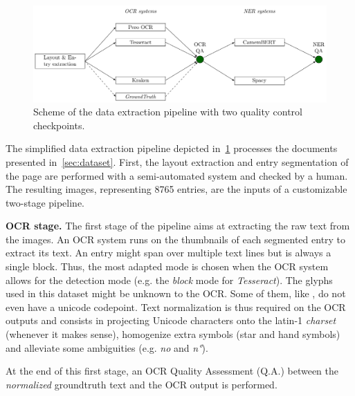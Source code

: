 \begin{figure}[tb]
    \includegraphics[width=\linewidth]{figs/protocol.pdf}
    \caption{Scheme of the data extraction pipeline with two quality control checkpoints. }
    \label{fig.pipeline}
\end{figure}



The simplified data extraction pipeline depicted in~\cref{fig.pipeline} processes the documents presented
in~\cref{sec:dataset}. First, the layout extraction and entry segmentation of the page are performed with a
semi-automated system and checked by a human. The resulting images, representing 8765 entries, are the inputs of a customizable two-stage pipeline.

\textbf{OCR stage.} The first stage of the pipeline aims at extracting the raw text from the images. An OCR system runs
on the thumbnails of each segmented entry to extract its text. An entry might span over multiple text lines but is
always a single block. Thus, the most adapted mode is chosen when the OCR system allows for the detection mode (e.g. the
\emph{block} mode for \emph{Tesseract}). The glyphs used in this dataset might be unknown to the OCR. Some of them, like
, do not even have a unicode codepoint. Text normalization is thus required
on the OCR outputs and consists in projecting Unicode characters onto the latin-1 \emph{charset} (whenever it makes
sense), homogenize extra symbols (star and hand symbols) and alleviate some ambiguities (e.g. \emph{no} and \emph{n°}).

At the end of this first stage, an OCR Quality Assessment (Q.A.) between the \emph{normalized} groundtruth text and the
OCR output is performed.

